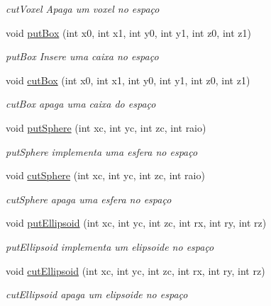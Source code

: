 \begin{DoxyCompactItemize}
\begin{DoxyCompactList}\small\item\em cut\+Voxel Apaga um voxel no espaço \end{DoxyCompactList}\item 
void \hyperlink{class_sculptor_a311ad7a0fb83fc67ac1f378be8e99fe1}{put\+Box} (int x0, int x1, int y0, int y1, int z0, int z1)
\begin{DoxyCompactList}\small\item\em put\+Box Insere uma caixa no espaço \end{DoxyCompactList}\item 
void \hyperlink{class_sculptor_aa84a1b12b09e9e103fc8d78f8d1bc00f}{cut\+Box} (int x0, int x1, int y0, int y1, int z0, int z1)
\begin{DoxyCompactList}\small\item\em cut\+Box apaga uma caixa do espaço \end{DoxyCompactList}\item 
void \hyperlink{class_sculptor_a7ad429e4c9bee30af79485b97a67885f}{put\+Sphere} (int xc, int yc, int zc, int raio)
\begin{DoxyCompactList}\small\item\em put\+Sphere implementa uma esfera no espaço \end{DoxyCompactList}\item 
void \hyperlink{class_sculptor_a7fc1bd095f9f1019d1619673905f6cdc}{cut\+Sphere} (int xc, int yc, int zc, int raio)
\begin{DoxyCompactList}\small\item\em cut\+Sphere apaga uma esfera no espaço \end{DoxyCompactList}\item 
void \hyperlink{class_sculptor_aab6773c379cee65ef0e93de25079a23d}{put\+Ellipsoid} (int xc, int yc, int zc, int rx, int ry, int rz)
\begin{DoxyCompactList}\small\item\em put\+Ellipsoid implementa um elipsoide no espaço \end{DoxyCompactList}\item 
void \hyperlink{class_sculptor_a84b3495724695476daa2e9b83df7cb03}{cut\+Ellipsoid} (int xc, int yc, int zc, int rx, int ry, int rz)
\begin{DoxyCompactList}\small\item\em cut\+Ellipsoid apaga um elipsoide no espaço \end{DoxyCompactList}\item 

\end{DoxyCompactItemize}
